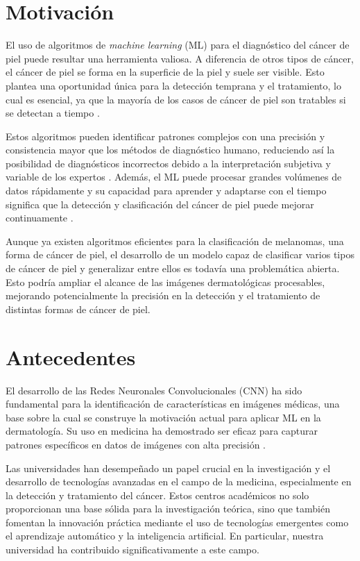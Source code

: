 \section*{Motivación}

El uso de algoritmos de \textit{machine learning} (ML) para el diagnóstico del cáncer de piel puede resultar una herramienta valiosa. A diferencia de otros tipos de cáncer, el cáncer de piel se forma en la superficie de la piel y suele ser visible. Esto plantea una oportunidad única para la detección temprana y el tratamiento, lo cual es esencial, ya que la mayoría de los casos de cáncer de piel son tratables si se detectan a tiempo .

Estos algoritmos pueden identificar patrones complejos con una precisión y consistencia mayor que los métodos de diagnóstico humano, reduciendo así la posibilidad de diagnósticos incorrectos debido a la interpretación subjetiva y variable de los expertos . Además, el ML puede procesar grandes volúmenes de datos rápidamente y su capacidad para aprender y adaptarse con el tiempo significa que la detección y clasificación del cáncer de piel puede mejorar continuamente .

Aunque ya existen algoritmos eficientes para la clasificación de melanomas, una forma de cáncer de piel, el desarrollo de un modelo capaz de clasificar varios tipos de cáncer de piel y generalizar entre ellos es todavía una problemática abierta. Esto podría ampliar el alcance de las imágenes dermatológicas procesables, mejorando potencialmente la precisión en la detección y el tratamiento de distintas formas de cáncer de piel.


\section*{Antecedentes}

El desarrollo de las Redes Neuronales Convolucionales (CNN) ha sido fundamental para la identificación de características en imágenes médicas, una base sobre la cual se construye la motivación actual para aplicar ML en la dermatología. Su uso en medicina ha demostrado ser eficaz para capturar patrones específicos en datos de imágenes con alta precisión .

Las universidades han desempeñado un papel crucial en la investigación y el desarrollo de tecnologías avanzadas en el campo de la medicina, especialmente en la detección y tratamiento del cáncer. Estos centros académicos no solo proporcionan una base sólida para la investigación teórica, sino que también fomentan la innovación práctica mediante el uso de tecnologías emergentes como el aprendizaje automático y la inteligencia artificial. En particular, nuestra universidad ha contribuido significativamente a este campo.

